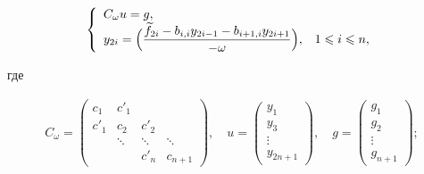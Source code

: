 \begin{equation}

\label{short tridiag system} \left\{

\begin{array}{ll}

 C_{\omega} u = g,  \\

\displaystyle y_{2i} = \Bigl( \frac{\widetilde{f}_{2i} - b_{i,i}y_{2i-1} -

b_{i+1,i}y_{2i+1}}{-\omega} \Bigr), & 1 \leqslant i \leqslant n,

\end{array}

\right.

\end{equation}

где

\begin{gather*}

C_{\omega} = \left(

\begin{array}{cccccc}

c_1 & c'_1 & & \\

c'_1 & c_2 & c'_2 & \\

& \ddots & \ddots & \ddots \\

& & c'_n & c_{n+1}

\end{array}

\right), \quad  u = \left(

\begin{array}{c}

{y_1} \\

{y_3} \\

\vdots \\

{y_{2n+1}}

\end{array}

\right), \quad  g = \left(

\begin{array}{c}

g_1 \\

g_2 \\

\vdots \\

g_{n+1}

\end{array}

\right);

\end{gather*}

